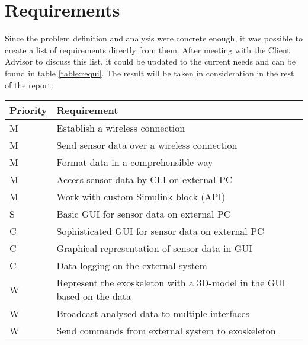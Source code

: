 \section{Requirements}\label{sec:req}
Since the problem definition and analysis were concrete enough, it was possible to create a list of requirements directly from them. After meeting with the Client Advisor to discuss this list, it could be updated to the current needs and can be found in table \ref{table:requi}. The result will be taken in consideration in the rest of the report:\\

{\renewcommand{\arraystretch}{1.5}
	\centering
	\begin{tabular}{ | l | l | }
		\hline
		\bfseries{Priority} & \bfseries{Requirement} \\ \hline
		M & Establish a wireless connection \\ \hline
		M & Send sensor data over a wireless connection \\ \hline
		M & Format data in a comprehensible way \\ \hline
		M & Access sensor data by CLI on external PC \\ \hline
		M & Work with custom Simulink block (API) \\ \hline
		S & Basic GUI for sensor data on external PC \\ \hline
		C & Sophisticated GUI for sensor data on external PC\\ \hline
		C & Graphical representation of sensor data in GUI\\ \hline
		C & Data logging on the external system \\ \hline
		W & Represent the exoskeleton with a 3D-model in the GUI based on the data \\ \hline
		W & Broadcast analysed data to multiple interfaces \\ \hline 
		W & Send commands from external system to exoskeleton \\ \hline 
	\end{tabular}
	\label{table:requi}
}